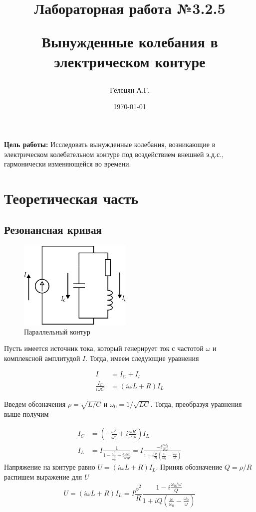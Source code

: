 \documentclass{article}
\title{\begin{center}Лабораторная работа №3.2.5\end{center}
Вынужденные колебания в электрическом контуре}
\author{Гёлецян А.Г.}
\date{\today}
\begin{document}
\maketitle
\newpage
{}

\textbf{Цель работы:} Исследовать вынужденные колебания, возникающие в электрическом
колебательном контуре под воздействием внешней э.д.с., гармонически изменяющейся во
времени.

\section{Теоретическая часть}\label{theory}
\subsection{Резонансная кривая}\label{theory_achx}
\vspace{0.5cm}
\begin{figure}
  \begin{center}
    \includegraphics[width=0.48\textwidth]{sxema.png}
  \end{center}
  \caption{Параллельный контур}\label{fig:sxema}
\end{figure}

Пусть имеется источник тока, который генерирует ток с частотой $\omega$ и комплексной
амплитудой $I$. Тогда, имеем следующие уравнения

\begin{align*}
    I &= I_C + I_l \\
    \frac{I_C}{i\omega C} &= (i\omega L + R) I_L
\end{align*}

Введем обозначения $\rho=\sqrt{L/C}$ и $\omega_0=1/\sqrt{LC}$. Тогда, преобразуя уравнения выше получим

\begin{align*}
    I_C &= \left(-\frac{\omega^2}{\omega^2_0} +i\frac{\omega R}{\omega_0\rho}\right)I_L\\
    I_L &= I\frac{1}{1-\frac{\omega^2}{\omega_0^2} + i \frac{\omega R}{\omega_0 \rho}} = 
        I \frac{-i\frac{\rho\omega_0}{R\omega}}{1+i\frac{\rho}{R}\left(
            \frac{\omega}{\omega_0} - \frac{\omega_0}{\omega}\right)}
\end{align*}
Напряжение на контуре равно $U = (i\omega L + R)I_L$. Приняв обозначение $Q=\rho/R$
распишем выражение для $U$
\begin{equation}
    U = (i\omega L+R)I_L=I\frac{\rho^2}{R}\frac{1 - i\frac{\omega_0/\omega}{Q}}
    {1 + iQ\left(\frac{\omega}{\omega_0} - \frac{\omega_0}{\omega}\right)}
\end{equation}\label{eq:voltage}
\end{document}
